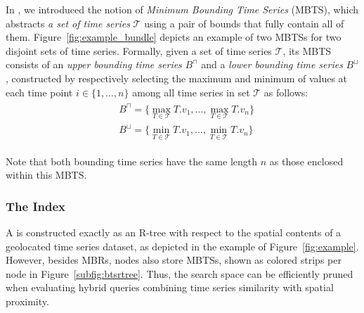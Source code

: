 In \cite{chatzig17btsr}, we introduced the notion of {\em Minimum Bounding Time Series} (MBTS), which abstracts {\em a set of time series}  $\mathcal{T}$ using a pair of bounds that fully contain all of them.  Figure~\ref{fig:example_bundle} depicts an example of two MBTSs for two disjoint sets of time series. Formally, given a set of time series $\mathcal{T}$, its MBTS consists of an \emph{upper bounding time series} $B^{\sqcap}$ and a \emph{lower bounding time series} $B^{\sqcup}$, constructed by respectively selecting the maximum and minimum of values at each time point $i \in \{ 1, \dots, n \}$ among all time series in set $\mathcal{T}$ as follows:
\begin{align}\label{eq:bounds1}
 \begin{split}
  & B^{\sqcap} = \{ \max_{T \in \mathcal{T}} T.v_1, \ldots, \max_{T \in \mathcal{T}} T.v_{n} \} \\
  & B^{\sqcup} = \{ \min_{T \in \mathcal{T}} T.v_1, \ldots, \min_{T \in \mathcal{T}} T.v_{n} \}
 \end{split}
\end{align}

Note that both bounding time series have the same length $n$ as those enclosed within this MBTS.


\subsubsection{The \btsr Index}
\label{subsec:btsr}

A \btsr is constructed exactly as an R-tree \cite{Guttman1984} with respect to the spatial contents of a geolocated time series dataset, as depicted in the example of Figure~\ref{fig:example}. However, besides MBRs, nodes also store MBTSs, shown as colored strips per node in Figure~\ref{subfig:btsrtree}. Thus, the search space can be efficiently pruned when evaluating hybrid queries combining time series similarity with spatial proximity.



